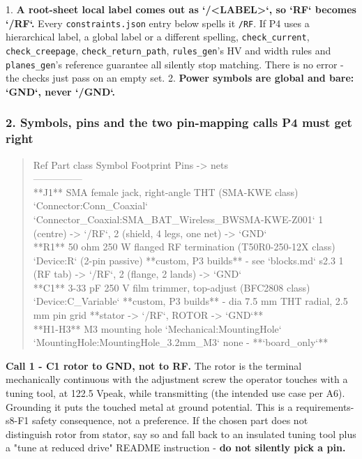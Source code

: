 \documentclass[11pt,a4paper]{article}
\begin{document}
1. \textbf{A root-sheet local label comes out as `/\textless{}LABEL\textgreater{}`, so `RF` becomes `/RF`.} Every \texttt{constraints.json} entry below spells it \texttt{/RF}. If P4 uses a hierarchical label, a global label or a different spelling, \texttt{check\_current}, \texttt{check\_creepage}, \texttt{check\_return\_path}, \texttt{rules\_gen}'s HV and width rules and \texttt{planes\_gen}'s reference guarantee all silently stop matching. There is no error - the checks just pass on an empty set. 2. \textbf{Power symbols are global and bare: `GND`, never `/GND`.}

\subsubsection*{2. Symbols, pins and the two pin-mapping calls P4 must get right}
\begin{quote}\small\ttfamily\raggedright
\textbar{} Ref \textbar{} Part class \textbar{} Symbol \textbar{} Footprint \textbar{} Pins -\textgreater{} nets \textbar{}\\
\textbar{}---\textbar{}---\textbar{}---\textbar{}---\textbar{}---\textbar{}\\
\textbar{} {*}{*}J1{*}{*} \textbar{} SMA female jack, right-angle THT (SMA-KWE class) \textbar{} `Connector:Conn\_Coaxial` \textbar{} `Connector\_Coaxial:SMA\_BAT\_Wireless\_BWSMA-KWE-Z001` \textbar{} 1 (centre) -\textgreater{} `/RF`, 2 (shield, 4 legs, one net) -\textgreater{} `GND` \textbar{}\\
\textbar{} {*}{*}R1{*}{*} \textbar{} 50 ohm 250 W flanged RF termination (T50R0-250-12X class) \textbar{} `Device:R` (2-pin passive) \textbar{} {*}{*}custom, P3 builds{*}{*} - see `blocks.md` s2.3 \textbar{} 1 (RF tab) -\textgreater{} `/RF`, 2 (flange, 2 lands) -\textgreater{} `GND` \textbar{}\\
\textbar{} {*}{*}C1{*}{*} \textbar{} 3-33 pF 250 V film trimmer, top-adjust (BFC2808 class) \textbar{} `Device:C\_Variable` \textbar{} {*}{*}custom, P3 builds{*}{*} - dia 7.5 mm THT radial, 2.5 mm pin grid \textbar{} {*}{*}stator -\textgreater{} `/RF`, ROTOR -\textgreater{} `GND`{*}{*} \textbar{}\\
\textbar{} {*}{*}H1-H3{*}{*} \textbar{} M3 mounting hole \textbar{} `Mechanical:MountingHole` \textbar{} `MountingHole:MountingHole\_3.2mm\_M3` \textbar{} none - {*}{*}`board\_only`{*}{*} \textbar{}
\end{quote}
\textbf{Call 1 - C1 rotor to GND, not to RF.} The rotor is the terminal mechanically continuous with the adjustment screw the operator touches with a tuning tool, at 122.5 Vpeak, while transmitting (the intended use case per A6). Grounding it puts the touched metal at ground potential. This is a requirements-s8-F1 safety consequence, not a preference. If the chosen part does not distinguish rotor from stator, say so and fall back to an insulated tuning tool plus a "tune at reduced drive" README instruction - \textbf{do not silently pick a pin.}
\end{document}
